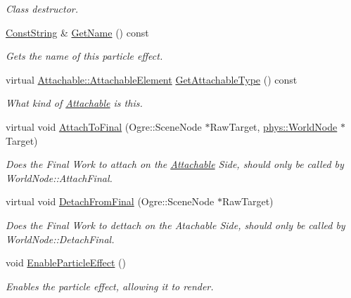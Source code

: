\begin{DoxyCompactItemize}
\begin{DoxyCompactList}\small\item\em Class destructor. \item\end{DoxyCompactList}\item 
\hyperlink{namespacephys_a5ce5049f8b4bf88d6413c47b504ebb31}{ConstString} \& \hyperlink{classphys_1_1ParticleEffect_a770309a3ec74b8bff6169ce5aecc64e7}{GetName} () const 
\begin{DoxyCompactList}\small\item\em Gets the name of this particle effect. \item\end{DoxyCompactList}\item 
virtual \hyperlink{classphys_1_1Attachable_acd1fca033e7cc0bb3024a92d466d213a}{Attachable::AttachableElement} \hyperlink{classphys_1_1ParticleEffect_a86553a292cee35953b98d1d7e34b6a0d}{GetAttachableType} () const 
\begin{DoxyCompactList}\small\item\em What kind of \hyperlink{classphys_1_1Attachable}{Attachable} is this. \item\end{DoxyCompactList}\item 
virtual void \hyperlink{classphys_1_1ParticleEffect_a83a533b22d3926775562bdf0a1dd8e5b}{AttachToFinal} (Ogre::SceneNode $\ast$RawTarget, \hyperlink{classphys_1_1WorldNode}{phys::WorldNode} $\ast$Target)
\begin{DoxyCompactList}\small\item\em Does the Final Work to attach on the \hyperlink{classphys_1_1Attachable}{Attachable} Side, should only be called by WorldNode::AttachFinal. \item\end{DoxyCompactList}\item 
virtual void \hyperlink{classphys_1_1ParticleEffect_a6cecfcd4177514f4323c653d0ea2c2c5}{DetachFromFinal} (Ogre::SceneNode $\ast$RawTarget)
\begin{DoxyCompactList}\small\item\em Does the Final Work to dettach on the Atachable Side, should only be called by WorldNode::DetachFinal. \item\end{DoxyCompactList}\item 
void \hyperlink{classphys_1_1ParticleEffect_aee95ac9b688885361d3066a5a4b83965}{EnableParticleEffect} ()
\begin{DoxyCompactList}\small\item\em Enables the particle effect, allowing it to render. \item\end{DoxyCompactList}\item 

\end{DoxyCompactItemize}
